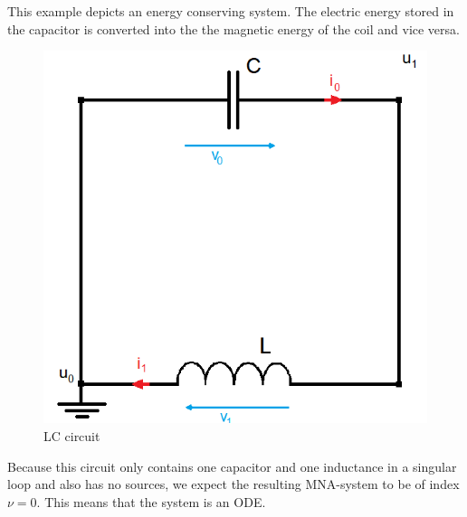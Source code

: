 	
\begin{example2}
	This example depicts an energy conserving system. The electric energy stored in the capacitor is converted into the the magnetic energy of the coil and vice versa.
	\begin{figure}[H]
		\centering
		\includegraphics[scale = 0.4]{pictures/Example2_index0.png}
		\caption{LC circuit}
	\end{figure}
	Because this circuit only contains one capacitor and one inductance in a singular loop and also has no sources, we expect the resulting MNA-system to be of index $\nu=0$. This means that the system is an ODE.
	

\end{example2}
